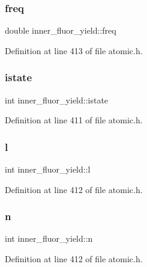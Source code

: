 \subsubsection{\texorpdfstring{freq}{freq}}
{\footnotesize\ttfamily double inner\+\_\+fluor\+\_\+yield\+::freq}



Definition at line 413 of file atomic.\+h.

\mbox{\label{structinner__fluor__yield_a7325c8e87d6bb7bcca9440ded77a28e4}} 
\subsubsection{\texorpdfstring{istate}{istate}}
{\footnotesize\ttfamily int inner\+\_\+fluor\+\_\+yield\+::istate}



Definition at line 411 of file atomic.\+h.

\mbox{\label{structinner__fluor__yield_aaa4ed7b58ea52b19cf4cd6248f51c4e3}} 
\subsubsection{\texorpdfstring{l}{l}}
{\footnotesize\ttfamily int inner\+\_\+fluor\+\_\+yield\+::l}



Definition at line 412 of file atomic.\+h.

\mbox{\label{structinner__fluor__yield_a64ede07da38d3947ea0a054692747ee0}} 
\subsubsection{\texorpdfstring{n}{n}}
{\footnotesize\ttfamily int inner\+\_\+fluor\+\_\+yield\+::n}



Definition at line 412 of file atomic.\+h.

